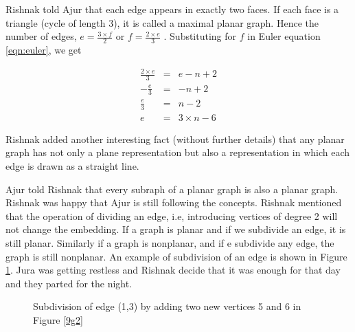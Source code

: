 Rishnak told Ajur that each edge appears in exactly two faces. If each face is a triangle (cycle of length 3), it is called a maximal planar graph. Hence the number of edges, $e=\frac{3 \times f}{2}$ or $f=\frac{2 \times e}{3}$ . Substituting for $f$ in Euler equation \ref{eqn:euler}, we get

\begin{eqnarray*}
    \label{eqn:maxplanar}
    \frac{2\times e}{3}&=&e-n+2\\
    -\frac{e}{3} &=&-n+2\\
    \frac{e}{3}&=&n-2\\
    e&=& 3 \times n - 6
\end{eqnarray*}

Rishnak added another interesting fact (without further details) that any planar graph has not only a plane representation but also a representation in which each edge is drawn as a straight line.

Ajur told Rishnak that every subraph of a planar graph is also a planar graph. Rishnak was happy that Ajur is still following the concepts. Rishnak mentioned that the operation of dividing an edge, i.e, introducing vertices of degree 2 will not change the embedding. If a graph is planar and if we subdivide an edge, it is still planar. Similarly if a graph is nonplanar, and if e subdivide any edge, the graph is still nonplanar. An example of subdivision of an edge is shown in Figure \ref{9g9}. Jura was getting restless and Rishnak decide that it was enough for that day and they parted for the night.

\begin{figure}[h]
\begin{center}
\caption{ Subdivision of edge (1,3) by adding two new vertices 5 and 6 in Figure \ref{9g2}}\label{9g9}
\end{center}
\end{figure}

